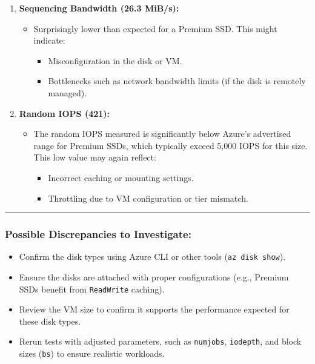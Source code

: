 \documentclass[11pt]{article}
\providecommand{\tightlist}{%
      \setlength{\itemsep}{0pt}\setlength{\parskip}{0pt}}
\begin{document}
\begin{enumerate}
\def\labelenumi{\arabic{enumi}.}
\tightlist
\item
  \textbf{Sequencing Bandwidth (26.3 MiB/s):}

  \begin{itemize}
  \tightlist
  \item
    Surprisingly lower than expected for a Premium SSD. This might
    indicate:

    \begin{itemize}
    \tightlist
    \item
      Misconfiguration in the disk or VM.
    \item
      Bottlenecks such as network bandwidth limits (if the disk is
      remotely managed).
    \end{itemize}
  \end{itemize}
\item
  \textbf{Random IOPS (421):}

  \begin{itemize}
  \tightlist
  \item
    The random IOPS measured is significantly below Azure's advertised
    range for Premium SSDs, which typically exceed 5,000 IOPS for this
    size. This low value may again reflect:

    \begin{itemize}
    \tightlist
    \item
      Incorrect caching or mounting settings.
    \item
      Throttling due to VM configuration or tier mismatch.
    \end{itemize}
  \end{itemize}
\end{enumerate}

\begin{center}\rule{0.5\linewidth}{0.5pt}\end{center}

\subsubsection{\texorpdfstring{\textbf{Possible Discrepancies to
Investigate:}}{Possible Discrepancies to Investigate:}}\label{possible-discrepancies-to-investigate}

\begin{itemize}
\tightlist
\item
  Confirm the disk types using Azure CLI or other tools
  (\texttt{az\ disk\ show}).
\item
  Ensure the disks are attached with proper configurations (e.g.,
  Premium SSDs benefit from \texttt{ReadWrite} caching).
\item
  Review the VM size to confirm it supports the performance expected for
  these disk types.
\item
  Rerun tests with adjusted parameters, such as \texttt{numjobs},
  \texttt{iodepth}, and block sizes (\texttt{bs}) to ensure realistic
  workloads.
\end{itemize}
\end{document}
